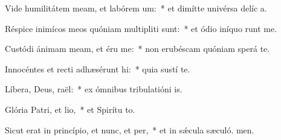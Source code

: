 \item Vide humilitátem meam, et labórem um:~* et dimítte univérsa delíc a.
\item Réspice inimícos meos quóniam multipliti sunt:~* et ódio iníquo runt me.
\item Custódi ánimam meam, et éru me:~* non erubéscam quóniam sperá  te.
\item Innocéntes et recti adhæsérunt hi:~* quia sustí te.
\item Líbera, Deus, raël:~* ex ómnibus tribulatióni is.
\item Glória Patri, et lio,~* et Spirítu to.
\item Sicut erat in princípio, et nunc, et per,~* et in sǽcula sæculó. men.
